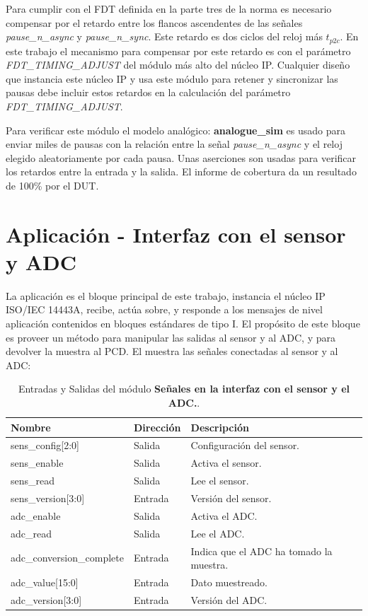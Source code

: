 \documentclass[a4paper, twoside, 11pt]{report}
\begin{document}
Para cumplir con el FDT definida en la parte tres de la norma es necesario compensar por el retardo entre los flancos ascendentes de las señales \textit{pause\_n\_async} y \textit{pause\_n\_sync}. Este retardo es dos ciclos del reloj más $t_{p2c}$. En este trabajo el mecanismo para compensar por este retardo es con el parámetro \textit{FDT\_TIMING\_ADJUST} del módulo más alto del núcleo IP. Cualquier diseño que instancia este núcleo IP y usa este módulo para retener y sincronizar las pausas debe incluir estos retardos en la calculación del parámetro \textit{FDT\_TIMING\_ADJUST}.

Para verificar este módulo el modelo analógico: \textbf{analogue\_sim} es usado para enviar miles de pausas con la relación entre la señal \textit{pause\_n\_async} y el reloj elegido aleatoriamente por cada pausa. Unas aserciones son usadas para verificar los retardos entre la entrada y la salida. El informe de cobertura da un resultado de 100\% por el DUT.

\FloatBarrier
\section{Aplicación - Interfaz con el sensor y ADC}

La aplicación es el bloque principal de este trabajo, instancia el núcleo IP ISO/IEC 14443A, recibe, actúa sobre, y responde a los mensajes de nivel aplicación contenidos en bloques estándares de tipo I. El propósito de este bloque es proveer un método para manipular las salidas al sensor y al ADC, y para devolver la muestra al PCD. El  muestra las señales conectadas al sensor y al ADC:

\begin{table}[htb]
  \centering
  \tablezebra
  \begin{tabulary}{\linewidth}{l|l|L}
    \setcounter{rownum}{0}
    \textbf{Nombre}&\textbf{Dirección}&\textbf{Descripción} \\
    \hline
    sens\_config[2:0]&Salida&Configuración del sensor. \\
    sens\_enable&Salida&Activa el sensor. \\
    sens\_read&Salida&Lee el sensor. \\
    sens\_version[3:0]&Entrada&Versión del sensor. \\
    adc\_enable&Salida&Activa el ADC. \\
    adc\_read&Salida&Lee el ADC. \\
    adc\_conversion\_complete&Entrada&Indica que el ADC ha tomado la muestra. \\
    adc\_value[15:0]&Entrada&Dato muestreado. \\
    adc\_version[3:0]&Entrada&Versión del ADC. \\
  \end{tabulary}
  \caption{Entradas y Salidas del módulo \textbf{Señales en la interfaz con el sensor y el ADC.}.}
  \label{tab:sens_adc_signals}
\end{table}
\end{document}
